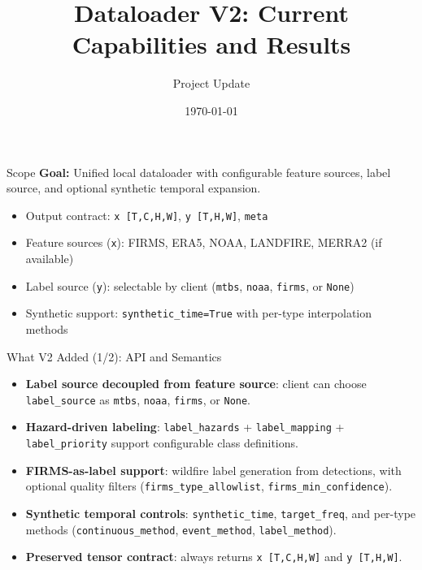 \documentclass{beamer}
\title{Dataloader V2: Current Capabilities and Results}
\author{Project Update}
\date{\today}
\begin{document}
\begin{frame}
  \titlepage
\end{frame}

\begin{frame}{Scope}
\textbf{Goal:} Unified local dataloader with configurable feature sources, label source, and optional synthetic temporal expansion.
\vspace{0.4em}
\begin{itemize}
  \item Output contract: \texttt{x [T,C,H,W]}, \texttt{y [T,H,W]}, \texttt{meta}
  \item Feature sources (\texttt{x}): FIRMS, ERA5, NOAA, LANDFIRE, MERRA2 (if available)
  \item Label source (\texttt{y}): selectable by client (\texttt{mtbs}, \texttt{noaa}, \texttt{firms}, or \texttt{None})
  \item Synthetic support: \texttt{synthetic\_time=True} with per-type interpolation methods
\end{itemize}
\end{frame}

\begin{frame}{What V2 Added (1/2): API and Semantics}
\begin{itemize}
  \item \textbf{Label source decoupled from feature source}: client can choose \texttt{label\_source} as \texttt{mtbs}, \texttt{noaa}, \texttt{firms}, or \texttt{None}.
  \item \textbf{Hazard-driven labeling}: \texttt{label\_hazards} + \texttt{label\_mapping} + \texttt{label\_priority} support configurable class definitions.
  \item \textbf{FIRMS-as-label support}: wildfire label generation from detections, with optional quality filters (\texttt{firms\_type\_allowlist}, \texttt{firms\_min\_confidence}).
  \item \textbf{Synthetic temporal controls}: \texttt{synthetic\_time}, \texttt{target\_freq}, and per-type methods (\texttt{continuous\_method}, \texttt{event\_method}, \texttt{label\_method}).
  \item \textbf{Preserved tensor contract}: always returns \texttt{x [T,C,H,W]} and \texttt{y [T,H,W]}.
\end{itemize}
\end{frame}
\end{document}
